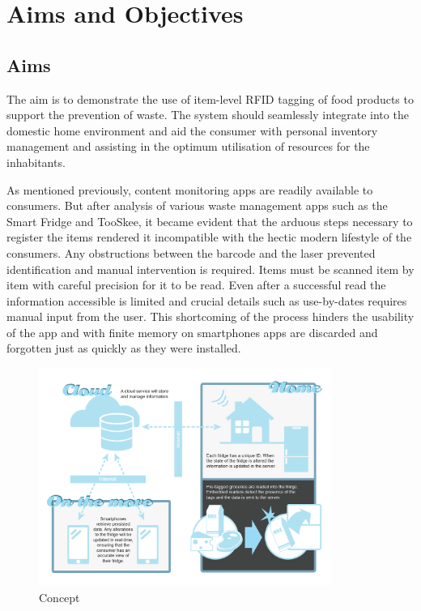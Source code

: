 \documentclass[a4paper, 11pt]{article}
\begin{document}

\clearpage

\section{Aims and Objectives}
\subsection{Aims}

The aim is to demonstrate the use of item-level RFID tagging of food products to support the prevention of waste. The system should seamlessly integrate into the domestic home environment and aid the consumer with personal inventory management and assisting in the optimum utilisation of resources for the inhabitants. 

As mentioned previously, content monitoring apps are readily available to consumers. But after analysis of various waste management apps such as the Smart Fridge and TooSkee, it became evident that the arduous steps necessary to register the items rendered it incompatible with the hectic modern lifestyle of the consumers. Any obstructions between the barcode and the laser prevented identification and manual intervention is required. Items must be scanned item by item with careful precision for it to be read. Even after a successful read the information accessible is limited and crucial details such as use-by-dates requires manual input from the user. This shortcoming of the process hinders the usability of the app and with finite memory on smartphones apps are discarded and forgotten just as quickly as they were installed.

\begin{figure}[h!]
  \centering
    \includegraphics[width=0.85\textwidth]{system2.png}
      \caption{Concept}
\end{figure}
\end{document}
